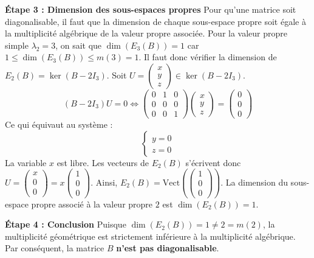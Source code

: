 \documentclass[11pt,a4paper]{article}
\begin{document}
\textbf{Étape 3 : Dimension des sous-espaces propres}
Pour qu'une matrice soit diagonalisable, il faut que la dimension de chaque sous-espace propre soit égale à la multiplicité algébrique de la valeur propre associée.
Pour la valeur propre simple $\lambda_2 = 3$, on sait que $\dim(E_3(B)) = 1$ car $1 \leq \dim(E_3(B)) \leq m(3) = 1$.
Il faut donc vérifier la dimension de $E_2(B) = \ker(B - 2I_3)$.
Soit $U = \begin{pmatrix} x \\ y \\ z \end{pmatrix} \in \ker(B - 2I_3)$.
$$(B - 2I_3)U = 0 \iff \begin{pmatrix} 0 & 1 & 0 \\ 0 & 0 & 0 \\ 0 & 0 & 1 \end{pmatrix} \begin{pmatrix} x \\ y \\ z \end{pmatrix} = \begin{pmatrix} 0 \\ 0 \\ 0 \end{pmatrix}$$
Ce qui équivaut au système :
$$\begin{cases} y = 0 \\ z = 0 \end{cases}$$
La variable $x$ est libre. Les vecteurs de $E_2(B)$ s'écrivent donc $U = \begin{pmatrix} x \\ 0 \\ 0 \end{pmatrix} = x \begin{pmatrix} 1 \\ 0 \\ 0 \end{pmatrix}$.
Ainsi, $E_2(B) = \text{Vect}\left(\begin{pmatrix} 1 \\ 0 \\ 0 \end{pmatrix}\right)$.
La dimension du sous-espace propre associé à la valeur propre $2$ est $\dim(E_2(B)) = 1$.

\textbf{Étape 4 : Conclusion}
Puisque $\dim(E_2(B)) = 1 \neq 2 = m(2)$, la multiplicité géométrique est strictement inférieure à la multiplicité algébrique.
Par conséquent, la matrice $B$ \textbf{n'est pas diagonalisable}.
\end{document}
